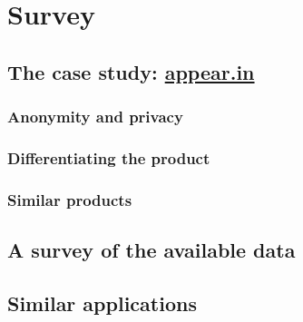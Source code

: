 \chapter{Survey}

\label{Chapter2}


\section{The case study: \url{appear.in}} %
\label{sec:the_case_study_appear.in}

\subsection{Anonymity and privacy}

\subsection{Differentiating the product}

\subsection{Similar products}


\section{A survey of the available data} %
\label{sec:survey_data}


\section{Similar applications} %
\label{sec:similar_applications}



